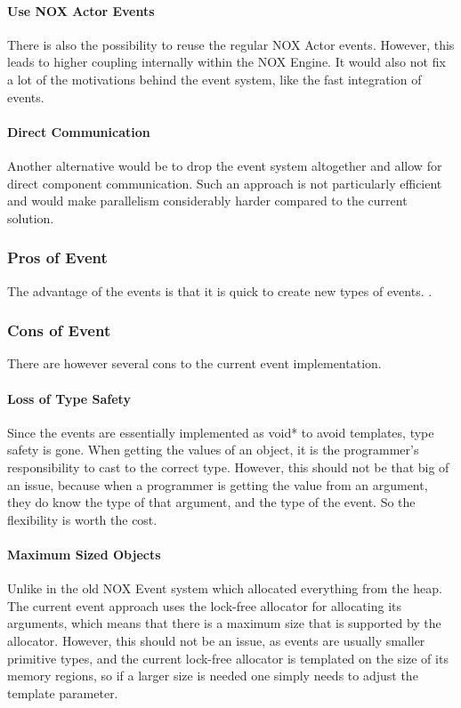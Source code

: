 \paragraph{Use NOX Actor Events}
There is also the possibility to reuse the regular NOX Actor events. 
However, this leads to higher coupling internally within the NOX Engine.
It would also not fix a lot of the motivations behind the event system, like the fast integration of events.

\paragraph{Direct Communication}
Another alternative would be to drop the event system altogether and allow for direct component communication. 
Such an approach is not particularly efficient and would make parallelism considerably harder compared to the current solution.

\subsubsection{Pros of Event}
The advantage of the events is that it is quick to create new types of events.
.

\subsubsection{Cons of Event}
There are however several cons to the current event implementation.

\paragraph{Loss of Type Safety}
Since the events are essentially implemented as void* to avoid templates, type safety is gone. When getting the values of an object, it is the programmer's responsibility to cast to the correct type.
However, this should not be that big of an issue, because when a programmer is getting the value from an argument, they do know the type of that argument, and the type of the event. 
So the flexibility is worth the cost.

\paragraph{Maximum Sized Objects}
Unlike in the old NOX Event system which allocated everything from the heap.
The current event approach uses the lock-free allocator for allocating its arguments, which means that there is a maximum size that is supported by the allocator.
However, this should not be an issue, as events are usually smaller primitive types, and the current lock-free allocator is templated on the size of its memory regions, so if a larger size is needed one simply needs to adjust the template parameter.

